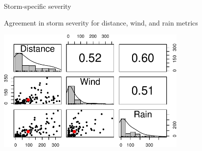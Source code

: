 \documentclass[ignorenonframetext,]{beamer}
\begin{document}
\begin{frame}{Storm-specific severity}

\begin{center}
\large Agreement in storm severity for distance, wind, and rain metrics
\end{center}

\begin{center}\includegraphics[width=0.7\textwidth]{anderson_jan11_files/figure-beamer/unnamed-chunk-16-1} \end{center}

\end{frame}
\end{document}

